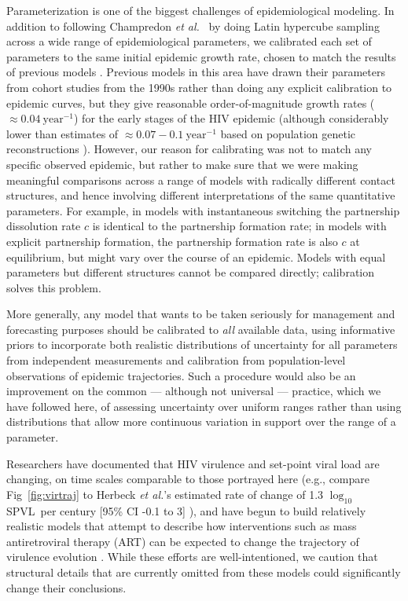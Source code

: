 \documentclass[10pt,letterpaper]{article}
\renewcommand{\figurename}{Fig}
\newcommand{\Lspvl}{$\log_{10}$ SPVL}
\newcommand{\etal}{\textit{et al.}}
\begin{document}
Parameterization is one of the biggest challenges of epidemiological
modeling. In addition to following Champredon \etal\ \cite{champredon_hiv_2013} 
by doing Latin hypercube
sampling across a wide range of epidemiological parameters, we 
calibrated each set of parameters to the same initial epidemic
growth rate, chosen to match the results of previous models
\cite{shirreff_transmission_2011}.  Previous models 
in this area have drawn their
parameters from cohort studies from the 1990s
\cite{wawer2005rates,hollingsworth_hiv1_2008}
rather than doing any explicit calibration to epidemic curves,
but they give reasonable order-of-magnitude
growth rates ($\approx 0.04~\textrm{year}^{-1}$)
for the early stages of the HIV epidemic (although considerably
lower than estimates of $\approx 0.07-0.1~\textrm{year}^{-1}$
based on population genetic reconstructions \cite{faria_early_2014}).
However, our reason for calibrating was not to match any
specific observed epidemic, but rather to make sure that
we were making meaningful comparisons across a range of
models with radically different contact structures, and
hence involving different interpretations of the same quantitative
parameters.  For example, in models with instantaneous switching the
partnership dissolution rate $c$ is identical to the partnership
formation rate; in models with explicit partnership formation,
the partnership formation rate is also $c$ at equilibrium,
but might vary over the course of an epidemic.
Models with equal parameters but
different structures cannot be compared directly; calibration
solves this problem.

More generally, any model that wants to be
taken seriously for management and forecasting purposes should
be calibrated to \emph{all} available data, using informative
priors to incorporate both realistic distributions of uncertainty
for all parameters from independent measurements \cite{elderd_uncertainty_2006}
and calibration from population-level observations of epidemic
trajectories. Such a procedure would also be an improvement on the common --- although not universal --- %
practice, which we have followed here,
of assessing uncertainty over uniform ranges rather than
using distributions that allow more continuous variation in support over
the range of a parameter.

Researchers have documented that HIV virulence and set-point viral
load are changing, on time scales comparable to those portrayed here
(e.g., compare \figurename~\ref{fig:virtraj} to Herbeck \etal's
estimated rate of change of 1.3 \Lspvl\ per century [95\% CI -0.1 to
  3] \cite{herbeck_is_2012}), and have begun to build relatively realistic models that
attempt to describe how interventions such as mass antiretroviral
therapy (ART) can be expected to change the trajectory of virulence
evolution \cite{payne_impact_2014,roberts2015impact,herbeck_evolution_2016}.  While these
efforts are well-intentioned, we caution that 
structural details that are currently omitted from these models
could significantly change their conclusions.
\end{document}
